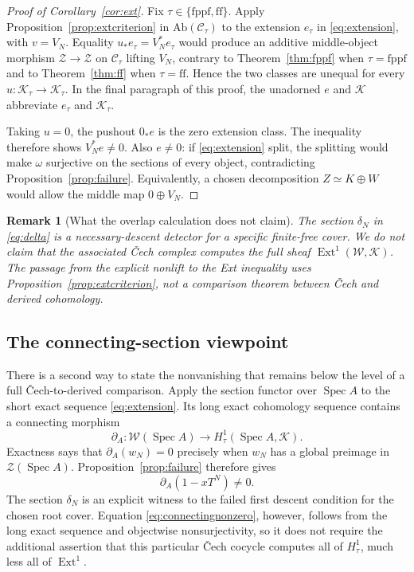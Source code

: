 \documentclass[11pt]{article}
\newtheorem{remark}[theorem]{Remark}
\theoremstyle{definition}
\newcommand{\Spec}{\operatorname{Spec}}
\newcommand{\Ext}{\operatorname{Ext}}
\newcommand{\Zsh}{\mathcal Z}
\newcommand{\Wsh}{\mathcal W}
\newcommand{\Ksh}{\mathcal K}
\newcommand{\ff}{\mathrm{ff}}
\newcommand{\fppf}{\mathrm{fppf}}
\begin{document}
\begin{proof}[Proof of Corollary~\ref{cor:ext}]
Fix \(\tau\in\{\fppf,\ff\}\).  Apply
Proposition~\ref{prop:extcriterion} in
\(\mathrm{Ab}(\mathscr C_\tau)\) to the extension \(e_\tau\) in
\eqref{eq:extension}, with \(v=V_N\).  Equality
\(u_*e_\tau=V_N^*e_\tau\) would produce an additive middle-object
morphism \(\Zsh\to\Zsh\) on \(\mathscr C_\tau\) lifting \(V_N\), contrary
to Theorem~\ref{thm:fppf} when \(\tau=\fppf\) and to
Theorem~\ref{thm:ff} when \(\tau=\ff\).  Hence the two classes are unequal
for every \(u\colon\Ksh_\tau\to\Ksh_\tau\).  In the final paragraph of
this proof, the unadorned \(e\) and \(\Ksh\) abbreviate \(e_\tau\) and
\(\Ksh_\tau\).

Taking \(u=0\), the pushout \(0_*e\) is the zero extension class.  The
inequality therefore shows \(V_N^*e\ne0\).  Also \(e\ne0\): if
\eqref{eq:extension} split, the splitting would make \(\omega\) surjective
on the sections of every object, contradicting
Proposition~\ref{prop:failure}.  Equivalently, a chosen decomposition
\(Z\simeq K\oplus W\) would allow the middle map \(0\oplus V_N\).
\end{proof}

\begin{remark}[What the overlap calculation does not claim]
The section \(\delta_N\) in \eqref{eq:delta} is a necessary-descent
detector for a specific finite-free cover.  We do not claim that the
associated \v Cech complex computes the full sheaf
\(\Ext^1(\Wsh,\Ksh)\).  The passage from the explicit nonlift to the Ext
inequality uses Proposition~\ref{prop:extcriterion}, not a comparison
theorem between \v Cech and derived cohomology.
\end{remark}

\subsection{The connecting-section viewpoint}

There is a second way to state the nonvanishing that remains below the
level of a full \v Cech-to-derived comparison.  Apply the section functor
over \(\Spec A\) to the short exact sequence
\eqref{eq:extension}.  Its long exact cohomology sequence contains a
connecting morphism
\[
 \partial_A\colon
 \Wsh(\Spec A)\longrightarrow
 H^1_\tau(\Spec A,\Ksh).
 \tag{5.2}\label{eq:connecting}
\]
Exactness says that \(\partial_A(w_N)=0\) precisely when \(w_N\) has a
global preimage in \(\Zsh(\Spec A)\).  Proposition~\ref{prop:failure}
therefore gives
\[
 \partial_A(1-xT^N)\ne0.
 \tag{5.3}\label{eq:connectingnonzero}
\]
The section \(\delta_N\) is an explicit witness to the failed first
descent condition for the chosen root cover.  Equation
\eqref{eq:connectingnonzero}, however, follows from the long exact
sequence and objectwise nonsurjectivity, so it does not require the
additional assertion that this particular \v Cech cocycle computes all of
\(H^1_\tau\), much less all of \(\Ext^1\).
\end{document}
